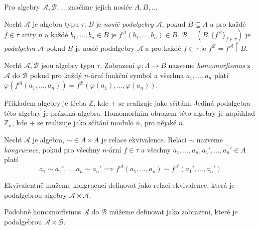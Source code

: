 Pro algebry $\mathcal{A}, \mathcal{B}, \ldots$ značíme jejich nosiče $A,
B, \ldots$

\begin{definition}[Podalgebra]
    Nechť $\mathcal{A}$ je algebra typu $\tau$. $B$ je {\em nosič
    podalgebry} $\mathcal{A}$, pokud $B \subseteq A$ a pro každé
    $f \in \tau$ arity $n$ a každé $b_1,\ldots,b_n \in B$
    je $f^\mathcal{A}(b_1, \ldots, b_n) \in B$.
    $\mathcal{B} = (B, \{ f^\mathcal{B} \}_{f \in \tau})$
    je {\em podalgebra} $\mathcal{A}$ pokud $B$ je nosič
    podalgebry $\mathcal{A}$ a pro každé $f \in \tau$ je
    $f^\mathcal{B} = f^\mathcal{A} \restriction B$.
\end{definition}

\begin{definition}[Homomorfismus]
    Nechť $\mathcal{A}, \mathcal{B}$ jsou algebry typu $\tau$.
    Zobrazení $\varphi : A \to B$ nazveme {\em homomorfismus}
    z $\mathcal{A}$ do $\mathcal{B}$ pokud
    pro každý $n$-ární funkční symbol a všechna $a_1,\ldots,a_n$
    platí $\varphi(f^\mathcal{A}(a_1,\ldots,a_n)) =
    f^\mathcal{B}(\varphi(a_1),\ldots,\varphi(a_n))$.
\end{definition}

\begin{definition}
    Příkladem algebry je třeba $\mathbb{Z}$, kde $+$ se realizuje jako
    sčítání. Jediná podalgebra této algebry je prázdná algebra.
    Homomorfním obrazem této algebry je například $\mathbb{Z}_n$,
    kde $+$ se realizuje jako sčítání modulo $n$, pro
    nějaké $n$.
\end{definition}

\begin{definition}[Kongruence]
    Nechť $\mathcal{A}$ je algebra,
    ${\sim} \in A \times A$ je relace ekvivalence.
    Relaci ${\sim}$ nazveme {\em kongruence},
    pokud pro všechny $n$-ární $f \in \tau$ a všechny
    $a_1, \ldots, a_n, a_1',\ldots,a_n' \in A$
    platí
    \[
    a_1 \sim a_1',\ldots, a_n \sim a_n' \implies
    f^\mathcal{A}(a_1, \ldots, a_n) \sim
    f^\mathcal{A}(a_1', \ldots, a_n')
    \]
\end{definition}

\begin{note}
    Ekvivalentně můžeme kongruenci definovat jako relaci ekvivalence,
    která je podalgebrou algebry $\mathcal{A} \times \mathcal{A}$.

    Podobně homomorfismus $\mathcal{A}$ do $\mathcal{B}$
    můžeme definovat jako zobrazení,
    které je podalgebrou $\mathcal{A} \times \mathcal{B}$.
\end{note}

